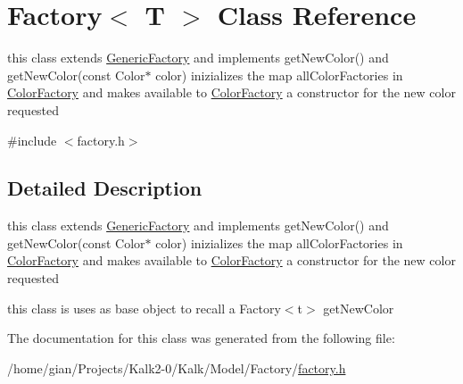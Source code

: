 \hypertarget{class_factory_3_01_t_01_4}{}\section{Factory$<$ T $>$ Class Reference}
\label{class_factory_3_01_t_01_4}


this class extends \hyperlink{class_generic_factory}{Generic\+Factory} and implements get\+New\+Color() and get\+New\+Color(const Color$\ast$ color) inizializes the map all\+Color\+Factories in \hyperlink{class_color_factory}{Color\+Factory} and makes available to \hyperlink{class_color_factory}{Color\+Factory} a constructor for the new color requested  




{\ttfamily \#include $<$factory.\+h$>$}



\subsection{Detailed Description}
this class extends \hyperlink{class_generic_factory}{Generic\+Factory} and implements get\+New\+Color() and get\+New\+Color(const Color$\ast$ color) inizializes the map all\+Color\+Factories in \hyperlink{class_color_factory}{Color\+Factory} and makes available to \hyperlink{class_color_factory}{Color\+Factory} a constructor for the new color requested 

this class is uses as base object to recall a Factory$<$t$>$ get\+New\+Color 

The documentation for this class was generated from the following file\+:\begin{DoxyCompactItemize}
\item 
/home/gian/\+Projects/\+Kalk2-\/0/\+Kalk/\+Model/\+Factory/\hyperlink{factory_8h}{factory.\+h}\end{DoxyCompactItemize}
